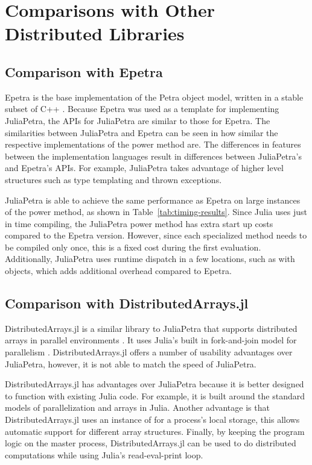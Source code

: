 \documentclass[acmsmall]{acmart}
\newcommand{\snippet}[1]{\texttt{\detokenize{#1}}}
\begin{document}
\section{Comparisons with Other Distributed Libraries}

\subsection{Comparison with Epetra}

Epetra is the base implementation of the Petra object model,
written in a stable subset of C++ \cite{Heroux:2005:Trilinos}.
Because Epetra was used as a template for implementing JuliaPetra,
the APIs for JuliaPetra are similar to those for Epetra.
The similarities between JuliaPetra and Epetra can be seen in how similar the respective implementations
of the power method are.
The differences in features between the implementation languages result in differences
between JuliaPetra's and Epetra's APIs.
For example, JuliaPetra takes advantage of higher level structures
such as type templating and thrown exceptions.

JuliaPetra is able to achieve the same performance as Epetra on large instances of the power method,
as shown in Table~\ref{tab:timing-results}.
Since Julia uses just in time compiling, the JuliaPetra power method has extra start up costs compared to
the Epetra version. However, since each specialized method needs to be compiled only once,
this is a fixed cost during the first evaluation.
Additionally, JuliaPetra uses runtime dispatch in a few locations, such as with
\snippet{Comm} objects, which adds additional overhead compared to Epetra.

\subsection{Comparison with DistributedArrays.jl}

DistributedArrays.jl is a similar library to JuliaPetra that supports
distributed arrays in parallel environments \cite{Github:DA}.
It uses Julia's built in fork-and-join model for parallelism
\cite{Bezanson:2017:FreshApproach}.
DistributedArrays.jl offers a number of usability advantages over JuliaPetra, however, it is not able to match the speed of JuliaPetra.

DistributedArrays.jl has advantages over JuliaPetra because it is better designed to function with
existing Julia code.
For example, it is built around the standard models of parallelization and arrays in Julia.
Another advantage is that DistributedArrays.jl uses an instance of \snippet{AbstractArray}
for a process's local storage, this allows automatic support for different array structures.
Finally, by keeping the program logic on the master process, DistributedArrays.jl can be used to
do distributed computations while using Julia's read-eval-print loop.
\end{document}
